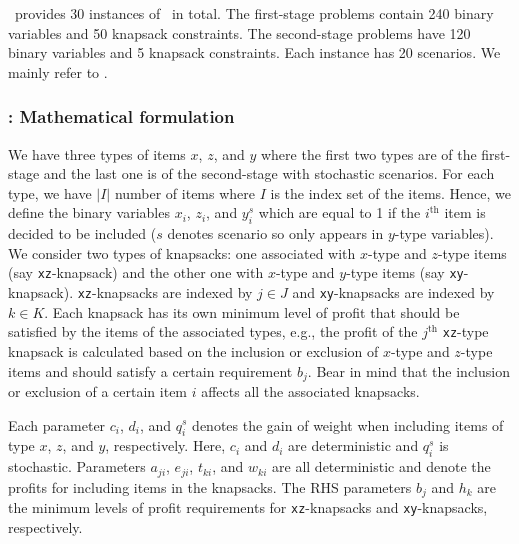 \siplib\ provides 30 instances of \smkp\ in total. The first-stage problems contain 240 binary variables and 50 knapsack constraints. The second-stage problems have 120 binary variables and 5 knapsack constraints. Each instance has 20 scenarios. 
We mainly refer to \cite{journal:AAD2014}.%
\subsubsection{\smkp: Mathematical formulation}
We have three types of items $x$, $z$, and $y$ where the first two types are of the first-stage and the last one is of the second-stage with stochastic scenarios. For each type, we have $|I|$ number of items where $I$ is the index set of the items. Hence, we define the binary variables $x_i$, $z_i$, and $y_i^s$ which are equal to 1 if the $i^{\mathrm{th}}$ item is decided to be included ($s$ denotes scenario so only appears in $y$-type variables). We consider two types of knapsacks: one associated with $x$-type and $z$-type items (say \texttt{xz}-knapsack) and the other one with $x$-type and $y$-type items (say \texttt{xy}-knapsack). \texttt{xz}-knapsacks are indexed by $j\in J$ and \texttt{xy}-knapsacks are indexed by $k\in K$.  Each knapsack has its own minimum level of profit that should be satisfied by the items of the associated types, e.g., the profit of the $j^{\mathrm{th}}$ \texttt{xz}-type knapsack is calculated based on the inclusion or exclusion of $x$-type and $z$-type items and should satisfy a certain requirement $b_j$. Bear in mind that the inclusion or exclusion of a certain item $i$ affects all the associated knapsacks.
 
Each parameter $c_i$, $d_i$, and $q_i^s$ denotes the gain of weight when including items of type $x$, $z$, and $y$, respectively. Here, $c_i$ and $d_i$ are deterministic and $q_i^s$ is stochastic. Parameters $a_{ji}$, $e_{ji}$, $t_{ki}$, and $w_{ki}$ are all deterministic and denote the profits for including items in the knapsacks. The RHS parameters $b_j$ and $h_k$ are the minimum levels of profit requirements for \texttt{xz}-knapsacks and \texttt{xy}-knapsacks, respectively.

